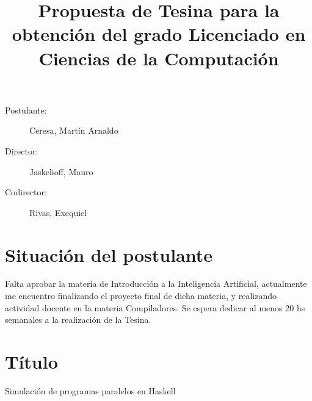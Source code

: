 \documentclass[11pt]{article}
\begin{document}
\title{Propuesta de Tesina para la obtenci\'on del grado Licenciado
en Ciencias de la Computaci\'on}
\maketitle

\begin{description}
  \item[Postulante:] Ceresa, Mart\'in Arnaldo
  \item[Director:] Jaskelioff, Mauro
  \item[Codirector:] Rivas, Exequiel
\end{description}

\section{Situaci\'on del postulante}
Falta aprobar la materia de Introducci\'on a la Inteligencia Artificial, actualmente
me encuentro finalizando el proyecto final de dicha materia, y realizando 
actividad docente en la materia Compiladores. Se espera dedicar al menos 20 hs 
semanales a la realizaci\'on de la Tesina.

\section{T\'itulo}
Simulaci\'on de programas paralelos en Haskell






\printbibliography
\end{document}
